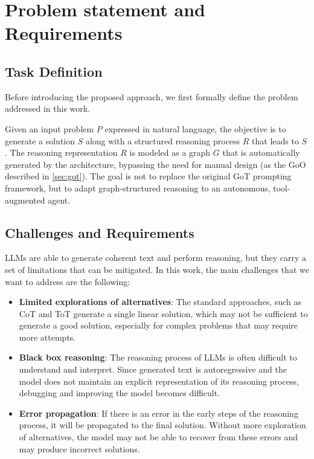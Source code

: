 \documentclass[12pt,a4paper,openright,twoside]{book}
\begin{document}
\section{Problem statement and Requirements}
\subsection{Task Definition}
Before introducing the proposed approach, we first formally define the problem addressed in this work.

Given an input problem $P$ expressed in natural language, the objective is to generate a solution $S$ along with a structured reasoning process $R$ that leads to $S$.
The reasoning representation $R$ is modeled as a graph $G$ that is automatically generated by the architecture, bypassing the need for manual design (as the \ac{GoO} described in \cref{sec:got}).
The goal is not to replace the original \ac{GoT} prompting framework, but to adapt graph-structured reasoning to an autonomous, tool-augmented agent.
\subsection{Challenges and Requirements}
\acp{LLM} are able to generate coherent text and perform reasoning, but they carry a set of limitations that can be mitigated. In this work, the main challenges that we want to address are the following:

\begin{itemize}
    \item \textbf{Limited explorations of alternatives}: The standard approaches, such as CoT and ToT generate a single linear solution, which may not be sufficient to generate a good solution, especially for complex problems that may require more attempts.
    \item \textbf{Black box reasoning}: The reasoning process of \acp{LLM} is often difficult to understand and interpret. Since generated text is autoregressive and the model does not maintain an explicit representation of its reasoning process, debugging and improving the model becomes difficult.
    \item \textbf{Error propagation}: If there is an error in the early steps of the reasoning process, it will be propagated to the final solution. Without more exploration of alternatives, the model may not be able to recover from these errors and may produce incorrect solutions. 
\end{itemize}
\end{document}
